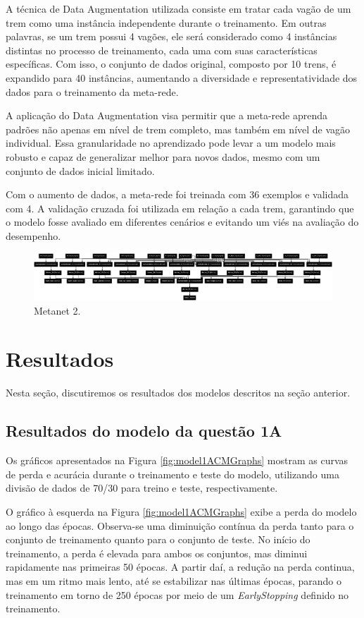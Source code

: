 \documentclass[12pt]{article}
\begin{document}
A técnica de Data Augmentation utilizada consiste em tratar cada vagão de um trem como uma instância independente durante o treinamento. Em outras palavras, se um trem possui 4 vagões, ele será considerado como 4 instâncias distintas no processo de treinamento, cada uma com suas características específicas. Com isso, o conjunto de dados original, composto por 10 trens, é expandido para 40 instâncias, aumentando a diversidade e representatividade dos dados para o treinamento da meta-rede.

A aplicação do Data Augmentation visa permitir que a meta-rede aprenda padrões não apenas em nível de trem completo, mas também em nível de vagão individual. Essa granularidade no aprendizado pode levar a um modelo mais robusto e capaz de generalizar melhor para novos dados, mesmo com um conjunto de dados inicial limitado.

Com o aumento de dados, a meta-rede foi treinada com 36 exemplos e validada com 4. A validação cruzada foi utilizada em relação a cada trem, garantindo que o modelo fosse avaliado em diferentes cenários e evitando um viés na avaliação do desempenho.

\begin{figure}[h]
    \centering
    \includegraphics[width=1\linewidth]{metanet2.png}
    \caption{Metanet 2.}
    \label{fig:metanet2}
\end{figure}

\section{Resultados}

Nesta seção, discutiremos os resultados dos modelos descritos na seção anterior.

\subsection{Resultados do modelo da questão 1A}

Os gráficos apresentados na Figura \ref{fig:model1ACMGraphs} mostram as curvas de perda e acurácia durante o treinamento e teste do modelo, utilizando uma divisão de dados de 70/30 para treino e teste, respectivamente.

O gráfico à esquerda na Figura \ref{fig:model1ACMGraphs} exibe a perda do modelo ao longo das épocas. Observa-se uma diminuição contínua da perda tanto para o conjunto de treinamento quanto para o conjunto de teste. No início do treinamento, a perda é elevada para ambos os conjuntos, mas diminui rapidamente nas primeiras 50 épocas. A partir daí, a redução na perda continua, mas em um ritmo mais lento, até se estabilizar nas últimas épocas, parando o treinamento em torno de 250 épocas por meio de um \textit{EarlyStopping} definido no treinamento.
\end{document}
